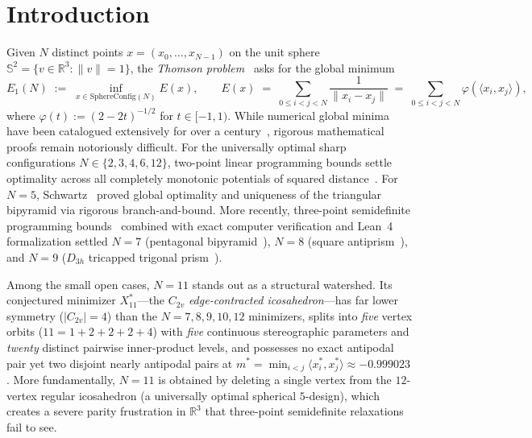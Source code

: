 \documentclass[11pt,reqno]{amsart}
\renewcommand{\_}{\origunderscore\allowbreak}
\theoremstyle{definition}
\newcommand{\R}{\mathbb{R}}
\newcommand{\Sph}{\mathbb{S}^2}
\newcommand{\ip}[2]{\langle #1, #2 \rangle}
\newcommand{\norm}[1]{\lVert #1 \rVert}
\newcommand{\Xstar}{X^*_{11}}
\begin{document}
\maketitle

\section{Introduction}\label{sec:intro}

Given $N$ distinct points $x = (x_0,\dots,x_{N-1})$ on the unit sphere $\Sph = \{v \in \R^3 : \norm{v} = 1\}$, the \emph{Thomson problem}~\cite{Thomson1904} asks for the global minimum
\begin{equation}\label{eq:energy}
  E_1(N) \;:=\; \inf_{x \in \mathrm{SphereConfig}(N)} E(x),
  \qquad E(x) \;=\; \sum_{0 \le i < j < N} \frac{1}{\norm{x_i - x_j}} \;=\; \sum_{0 \le i < j < N} \varphi(\ip{x_i}{x_j}),
\end{equation}
where $\varphi(t) := (2 - 2t)^{-1/2}$ for $t \in [-1, 1)$.
While numerical global minima have been catalogued extensively for over a century~\cite{ErberHockney1991,WalesUlker2006}, rigorous mathematical proofs remain notoriously difficult.
For the universally optimal sharp configurations $N \in \{2, 3, 4, 6, 12\}$, two-point linear programming bounds settle optimality across all completely monotonic potentials of squared distance~\cite{Yudin1992,Andreev1996,KolushovYudin1997,CohnKumar2007}.
For $N = 5$, Schwartz~\cite{Schwartz2013,Schwartz2023} proved global optimality and uniqueness of the triangular bipyramid via rigorous branch-and-bound.
More recently, three-point semidefinite programming bounds~\cite{BachocVallentin2008,CohnWoo2012} combined with exact computer verification and Lean~4 formalization settled $N = 7$ (pentagonal bipyramid~\cite{ValsN72026}), $N = 8$ (square antiprism~\cite{KLT2026,TZ2026}), and $N = 9$ ($D_{3h}$ tricapped trigonal prism~\cite{Li2026N9}).

Among the small open cases, $N = 11$ stands out as a structural watershed.
Its conjectured minimizer $\Xstar$---the $C_{2v}$ \emph{edge-contracted icosahedron}---has far lower symmetry ($|C_{2v}| = 4$) than the $N = 7, 8, 9, 10, 12$ minimizers, splits into \emph{five} vertex orbits ($11 = 1 + 2 + 2 + 2 + 4$) with \emph{five} continuous stereographic parameters and \emph{twenty} distinct pairwise inner-product levels, and possesses no exact antipodal pair yet two disjoint nearly antipodal pairs at $m^* = \min_{i<j}\ip{x_i^*}{x_j^*} \approx -0.999023$.
More fundamentally, $N = 11$ is obtained by deleting a single vertex from the $12$-vertex regular icosahedron (a universally optimal spherical $5$-design), which creates a severe parity frustration in $\R^3$ that three-point semidefinite relaxations fail to see.
\end{document}
